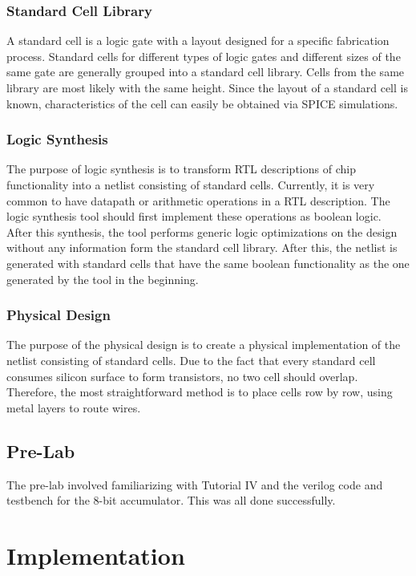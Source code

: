 \documentclass[12pt]{article}
\begin{document}
\subsubsection{Standard Cell Library}
A standard cell is a logic gate with a layout designed for a specific fabrication process. Standard cells for different types of logic gates and different sizes of the same gate are generally grouped into a standard cell library. Cells from the same library are most likely with the same height. Since the layout of a standard cell is known, characteristics of the cell can easily be obtained via SPICE simulations.
\subsubsection{Logic Synthesis}
The purpose of logic synthesis is to transform RTL descriptions of chip functionality into a netlist consisting of standard cells. Currently, it is very common to have datapath or arithmetic operations in a RTL description. The logic synthesis tool should first implement these operations as boolean logic. After this synthesis, the tool performs generic logic optimizations  on the design without any information form the standard cell library. After this, the netlist is generated with standard cells that have the same boolean functionality as the one generated by the tool in the beginning.
\subsubsection{Physical Design}
The purpose of the physical design is to create a physical implementation of the netlist consisting of standard cells. Due to the fact that every standard cell consumes silicon surface to form transistors, no two cell should overlap. Therefore, the most straightforward method is to place cells row by row, using metal layers to route wires.


\subsection{Pre-Lab}
The pre-lab involved familiarizing with Tutorial IV and the verilog code and testbench for the 8-bit accumulator. This was all done successfully.

\section{Implementation}
\end{document}
